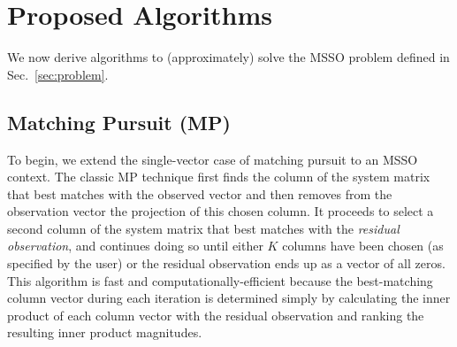 \documentclass[final]{siamltex}
\begin{document}
\section{Proposed Algorithms}
\label{sec:algorithms}

We
now derive algorithms to (approximately) solve
the MSSO problem defined in Sec.~\ref{sec:problem}.

\subsection{Matching Pursuit (MP)}

    To begin, we extend the single-vector case of matching pursuit
    \cite{Mal1993} to an MSSO context.  The classic MP technique first
    finds the column of the system matrix that best matches with the
    observed vector and then removes from the observation vector the
    projection of this chosen column.  It proceeds to select a second
    column of the system matrix that best matches with the
    {\em{residual observation}}, and continues doing so until either
    $K$ columns have been chosen (as specified by the user) or the
    residual observation ends up as a vector of all zeros.  This
    algorithm is fast and computationally-efficient because the
    best-matching column vector during each iteration is determined
    simply by calculating the inner product of each column vector with
    the residual observation and ranking the resulting inner product
    magnitudes.
    
\end{document}
